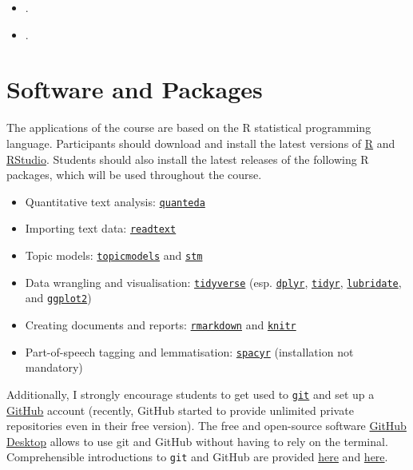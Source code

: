 \documentclass[abstract=on,parskip=full,headings=standardclasses,fontsize=11pt,paper=a4]{scrartcl}
\begin{document}
\begin{itemize}
\item {}.
\item {}.
\end{itemize}

\section*{Software and Packages}

The applications of the course are based on the \textsf{R} statistical programming language. Participants should download and install the latest versions of \textsf{\href{https://www.r-project.org}{R}} and \href{https://www.rstudio.com/products/rstudio/}{RStudio}. Students should also install the latest releases of the following  \textsf{R} packages, which will be used throughout the course.

\begin{itemize}
\item Quantitative text analysis: \href{https://quanteda.io/}{\texttt{quanteda}}
\item Importing text data: \href{https://readtext.quanteda.io/}{\texttt{readtext}}
\item Topic models: \href{https://cran.r-project.org/web/packages/topicmodels/index.html}{\texttt{topicmodels}}  and \href{https://www.structuraltopicmodel.com/}{\texttt{stm}}
\item Data wrangling and visualisation: \href{https://www.tidyverse.org}{\texttt{tidyverse}} (esp. \href{https://dplyr.tidyverse.org}{\texttt{dplyr}}, \href{https://tidyr.tidyverse.org}{\texttt{tidyr}}, \href{https://lubridate.tidyverse.org}{\texttt{lubridate}}, and \href{https://ggplot2.tidyverse.org}{\texttt{ggplot2}})
\item Creating documents and reports: \href{https://rmarkdown.rstudio.com}{\texttt{rmarkdown}} and \href{https://yihui.name/knitr/}{\texttt{knitr}}
\item Part-of-speech tagging and lemmatisation: \href{https://spacyr.quanteda.io}{\texttt{spacyr}} (installation not mandatory)
\end{itemize}

Additionally, I strongly encourage students to get used to \href{https://git-scm.com}{\texttt{git}}  and set up a \href{https://github.com}{GitHub} account (recently, GitHub started to provide unlimited private repositories even in their free version). The free  and open-source software \href{https://desktop.github.com}{GitHub Desktop} allows to use git and GitHub without having to rely on the terminal. Comprehensible introductions to \texttt{git} and GitHub are provided \href{https://guides.github.com/activities/hello-world/}{here} and \href{https://happygitwithr.com}{here}.
\end{document}
